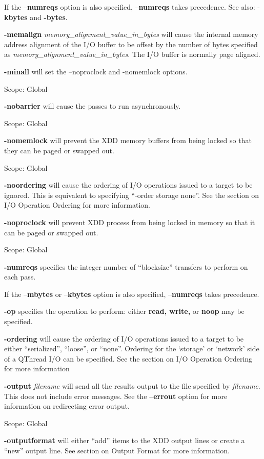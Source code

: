 If the --\textbf{numreqs} option is also specified, --\textbf{numreqs} takes precedence. See also: -\textbf{kbytes} and \textbf{-bytes}.

\textbf{-memalign} \emph{memory\_alignment\_value\_in\_bytes} will cause the internal memory address alignment of the I/O buffer to be offset by the number of bytes specified as \emph{memory\_alignment\_value\_in\_bytes.} The I/O buffer is normally page aligned.

\textbf{-minall} will set the --noproclock and -nomemlock options.

Scope: Global

\textbf{-nobarrier} will cause the passes to run asynchronously.

Scope: Global

\textbf{-nomemlock} will prevent the XDD memory buffers from being locked so that they can be paged or swapped out.

Scope: Global

\textbf{-noordering} will cause the ordering of I/O operations issued to a target to be ignored. This is equivalent to specifying ``-order storage none''. See the section on I/O Operation Ordering for more information.

\textbf{-noproclock} will prevent XDD process from being locked in memory so that it can be paged or swapped out.

Scope: Global

\textbf{-numreqs} specifies the integer number of ``blocksize'' transfers to perform on each pass.

If the --\textbf{mbytes} or --\textbf{kbytes} option is also specified, --\textbf{numreqs} takes precedence.

\textbf{-op} specifies the operation to perform: either \textbf{read, write,} or \textbf{noop} may be specified.

\textbf{-ordering} will cause the ordering of I/O operations issued to a target to be either ``serialized'', ``loose'', or ``none''. Ordering for the `storage' or `network' side of a QThread I/O can be specified. See the section on I/O Operation Ordering for more information

\textbf{-output} \emph{filename} will send all the results output to the file specified by \emph{filename}. This does not include error messages. See the \textbf{--errout} option for more information on redirecting error output.

Scope: Global

\textbf{-outputformat} will either ``add'' items to the XDD output lines or create a ``new'' output line. See section on Output Format for more information.

